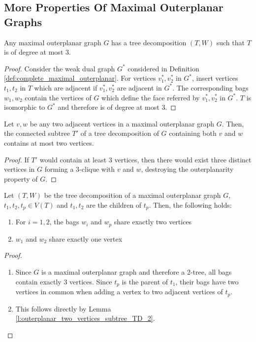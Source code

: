 \subsection{More Properties Of Maximal Outerplanar Graphs}


\begin{lemma}\label{l:outerplanar_tree_decomposition}
	Any maximal outerplanar graph $G$ has a tree decomposition $(T,W)$ such that $T$ is of degree at most 3.
\end{lemma}
\begin{proof}
	Consider the weak dual graph $G^*$ considered in Definition \ref{def:complete_maximal_outerplanar}. For vertices $v_1^*,v_2^*$ in $G^*$, insert vertices $t_1,t_2$ in $T$ which are adjacent if $v_1^*,v_2^*$ are adjacent in $G^*$. The corresponding bags $w_1, w_2$ contain the vertices of $G$ which define the face referred by $v_1^*,v_2^*$ in $G^*$. $T$ is isomorphic to $G^*$ and therefore is of degree at most 3.
\end{proof}


\begin{lemma}\label{l:outerplanar_two_vertices_subtree_TD_2}
	Let $v,w$ be any two adjacent vertices in a maximal outerplanar graph $G$. Then, the connected subtree $T'$ of a tree decomposition of $G$ containing both $v$ and $w$ contains at most two vertices.
\end{lemma}
\begin{proof}
	If $T'$ would contain at least 3 vertices, then there would exist three distinct vertices in $G$ forming a 3-clique with $v$ and $w$, destroying the outerplanarity property of $G$.
\end{proof}

\begin{lemma}\label{l:outerplanar_TD_properties}
	Let $(T,W)$ be the tree decomposition of a maximal outerplanar graph $G$, $t_1,t_2,t_p \in V(T)$ and $t_1, t_2$ are the children of $t_p$. Then, the following holds:
	\begin{enumerate}
		\item For $i = 1,2$, the bags $w_i$ and $w_p$ share exactly two vertices
		\item $w_1$ and $w_2$ share exactly one vertex
	\end{enumerate}
\end{lemma}
\begin{proof}
	\begin{enumerate}
		\item Since $G$ is a maximal outerplanar graph and therefore a 2-tree, all bags contain exactly 3 vertices. Since $t_p$ is the parent of $t_1$, their bags have two vertices in common when adding a vertex to two adjacent vertices of $t_p$.
		\item This follows directly by Lemma \ref{l:outerplanar_two_vertices_subtree_TD_2}.
	\end{enumerate}
\end{proof}

